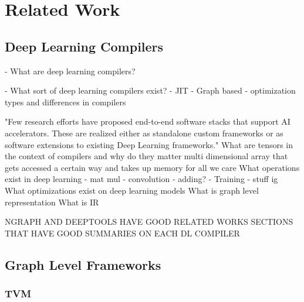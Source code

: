 
\chapter{Related Work} %

\label{Chapter2} %

\section{Deep Learning Compilers}

- What are deep learning compilers?

- What sort of deep learning compilers exist?
	- JIT
	- Graph based
	- optimization types and differences in compilers

"Few research efforts have proposed end-to-end software stacks that support AI accelerators. 
These are realized either as standalone custom frameworks or as software extensions to existing Deep Learning
frameworks." \cite{onsram}
What are tensors in the context of compilers and why do they matter
	multi dimensional array that gets accessed a certain way and takes up memory for all we care
What operations exist in deep learning
- mat mul
- convolution
- adding?
- Training
- stuff ig
What optimizations exist on deep learning models
What is graph level representation
What is IR 

NGRAPH AND DEEPTOOLS HAVE GOOD RELATED WORKS SECTIONS THAT HAVE GOOD SUMMARIES ON EACH DL COMPILER



\section{Graph Level Frameworks}


\subsection{TVM}

